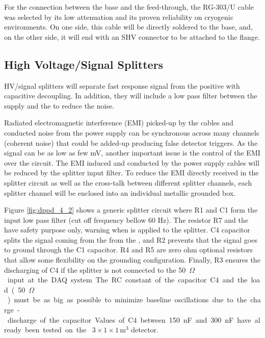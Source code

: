 For the connection between the  base and the feed-through, the RG-303/U cable was selected by its low attenuation and its proven reliability on cryogenic environments. On one side, this cable will be directly soldered to the  base, and, on the other side, it will end with an SHV connector to be attached to the flange. 

\subsection{High Voltage/Signal Splitters}
\label{sec:fddp-pd-4.2}

HV/signal splitters will separate fast  response signal from the positive  with capacitive decoupling. In addition, they will include a low pass filter between the  supply and the  to reduce the noise.

Radiated electromagnetic interference (EMI) picked-up by the cables and conducted noise from the  power supply can be synchronous across many  channels (coherent noise) that could be added-up producing false detector triggers. As the  signal can be as low as few mV, another important issue is the control of the EMI over the circuit. The EMI induced and conducted by the power supply cables will be reduced by the splitter  input filter. To reduce the EMI directly received in the splitter circuit as well as the cross-talk between different splitter channels, each splitter channel will be enclosed into an individual metallic grounded box.

Figure \ref{fig:dppd_4_2} shows a generic splitter circuit where R1 and C1 form the  input low pass filter (cut off frequency bellow 60 Hz). The resistor R7 and the   have safety purpose only, warning when  is applied to the splitter. C4 capacitor splits the signal coming from the  from the , and R2 prevents that the  signal goes to ground through the C1 capacitor. R4 and R5 are zero ohm optional resistors that allow some flexibility on the grounding configuration. Finally, R3 ensures the discharging of C4 if the splitter is not connected to the \SI{50}{$\Omega$} input at the DAQ system. The RC constant of the capacitor C4 and the load (\SI{50}{$\Omega$}) must be as big as possible to minimize baseline oscillations due to the charge-discharge of the capacitor. Values of C4 between \SI{150}{nF} and \SI{300}{nF} have already been tested on the   $3\times1\times1$\,m$^3$ detector.


